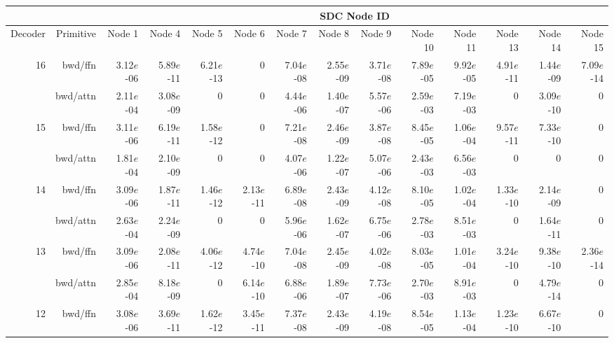 \begin{table*}[t]


\begin{center}
\begin{tiny}
\begin{sc}

\setlength{\tabcolsep}{3pt}
\begin{tabular}{rrrrrrrrrrrrrr}
\toprule
& & \multicolumn{12}{c}{SDC Node ID} \\
\midrule
Decoder & Primitive & Node 1        & Node 4        & Node 5        & Node 6        & Node 7        & Node 8        & Node 9        & Node 10       & Node 11       & Node 13       & Node 14       & Node 15       \\
\midrule
\multirow{2}{*}{16}           & bwd/ffn   & 3.12$e$-06 & 5.89$e$-11 & 6.21$e$-13 & 0 & 7.04$e$-08 & 2.55$e$-09 & 3.71$e$-08 & 7.89$e$-05 & 9.92$e$-05 & 4.91$e$-11 & 1.44$e$-09 & 7.09$e$-14 \\
              & bwd/attn  & 2.11$e$-04 & 3.08$e$-09 & 0 & 0 & 4.44$e$-06 & 1.40$e$-07 & 5.57$e$-06 & 2.59$e$-03 & 7.19$e$-03 & 0 & 3.09$e$-10 & 0 \\
\midrule
\multirow{2}{*}{15}             & bwd/ffn   & 3.11$e$-06 & 6.19$e$-11 & 1.58$e$-12 & 0 & 7.21$e$-08 & 2.46$e$-09 & 3.87$e$-08 & 8.45$e$-05 & 1.06$e$-04 & 9.57$e$-11 & 7.33$e$-10 & 0 \\
              & bwd/attn  & 1.81$e$-04 & 2.10$e$-09 & 0 & 0 & 4.07$e$-06 & 1.22$e$-07 & 5.07$e$-06 & 2.43$e$-03 & 6.56$e$-03 & 0 & 0 & 0 \\
\midrule
\multirow{2}{*}{14}             & bwd/ffn   & 3.09$e$-06 & 1.87$e$-11 & 1.46$e$-12 & 2.13$e$-11 & 6.89$e$-08 & 2.43$e$-09 & 4.12$e$-08 & 8.10$e$-05 & 1.02$e$-04 & 1.33$e$-10 & 2.14$e$-09 & 0 \\
              & bwd/attn  & 2.63$e$-04 & 2.24$e$-09 & 0 & 0 & 5.96$e$-06 & 1.62$e$-07 & 6.75$e$-06 & 2.78$e$-03 & 8.51$e$-03 & 0 & 1.64$e$-11 & 0 \\
\midrule
\multirow{2}{*}{13}             & bwd/ffn   & 3.09$e$-06 & 2.08$e$-11 & 4.06$e$-12 & 4.74$e$-10 & 7.04$e$-08 & 2.45$e$-09 & 4.02$e$-08 & 8.03$e$-05 & 1.01$e$-04 & 3.24$e$-10 & 9.38$e$-10 & 2.36$e$-14 \\
              & bwd/attn  & 2.85$e$-04 & 8.18$e$-09 & 0 & 6.14$e$-10 & 6.88$e$-06 & 1.89$e$-07 & 7.73$e$-06 & 2.70$e$-03 & 8.91$e$-03 & 0 & 4.79$e$-14 & 0 \\
\midrule
\multirow{2}{*}{12}            & bwd/ffn   & 3.08$e$-06 & 3.69$e$-11 & 1.62$e$-12 & 3.45$e$-11 & 7.37$e$-08 & 2.43$e$-09 & 4.19$e$-08 & 8.54$e$-05 & 1.13$e$-04 & 1.23$e$-10 & 6.67$e$-10 & 0 \\

\end{tabular}
\end{sc}
\end{tiny}
\end{center}
\end{table*}
